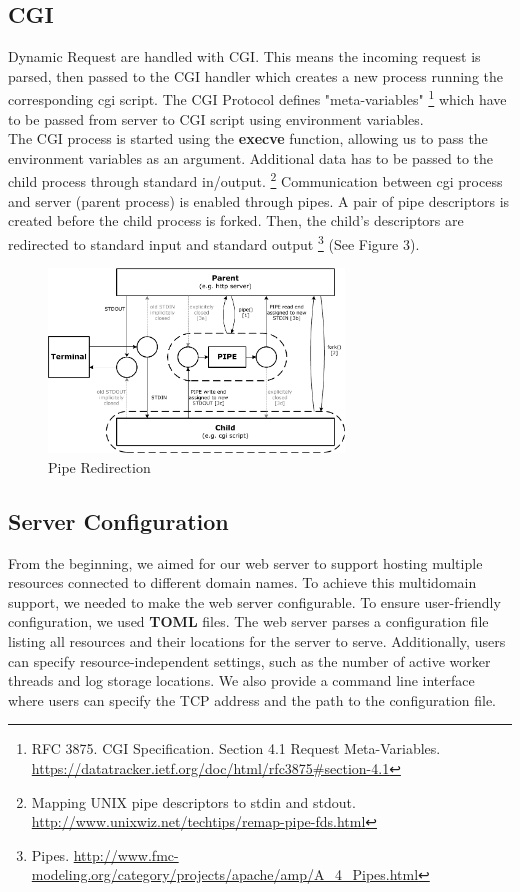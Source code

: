 \subsection*{CGI}
Dynamic Request are handled with CGI. This means the incoming request is parsed, then passed to the CGI handler which creates a new process running the corresponding cgi script. The CGI Protocol defines "meta-variables" \footnote{RFC 3875. CGI Specification. Section 4.1 Request Meta-Variables. \url{https://datatracker.ietf.org/doc/html/rfc3875#section-4.1}} which have to be passed from server to CGI script using environment variables. \\

The CGI process is started using the \textbf{execve} function, allowing us to pass the environment variables as an argument. Additional data has to be passed to the child process through standard in/output. \footnote{Mapping UNIX pipe descriptors to stdin and stdout. \url{http://www.unixwiz.net/techtips/remap-pipe-fds.html}}
Communication between cgi process and server (parent process) is enabled through pipes. A pair of pipe descriptors is created before the child process is forked. Then, the child's descriptors are redirected to standard input and standard output \footnote{Pipes. \url{http://www.fmc-modeling.org/category/projects/apache/amp/A\_4\_Pipes.html}} (See Figure 3).

\begin{figure}[h]
	\centering
	\includegraphics[width=0.7\textwidth]{figures/Pipes_BD.pdf}
	\caption{Pipe Redirection}
\end{figure}

\subsection*{Server Configuration}
From the beginning, we aimed for our web server to support hosting multiple resources connected to different domain names. To achieve this multidomain support, we needed to make the web server configurable. To ensure user-friendly configuration, we used \textbf{TOML} files. The web server parses a configuration file listing all resources and their locations for the server to serve. Additionally, users can specify resource-independent settings, such as the number of active worker threads and log storage locations. We also provide a command line interface where users can specify the TCP address and the path to the configuration file.

